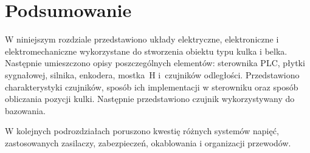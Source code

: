 \section{Podsumowanie}

W niniejszym rozdziale przedstawiono układy elektryczne, elektroniczne i elektromechaniczne wykorzystane do stworzenia obiektu typu kulka i belka. Następnie umieszczono opisy poszczególnych elementów: sterownika PLC, płytki sygnałowej, silnika, enkodera, mostka~H i~czujników odległości. Przedstawiono charakterystyki czujników, sposób ich implementacji w sterowniku oraz sposób obliczania pozycji kulki. Następnie przedstawiono czujnik wykorzystywany do bazowania.

W kolejnych podrozdziałach poruszono kwestię różnych systemów napięć, zastosowanych zasilaczy, zabezpieczeń, okablowania i organizacji przewodów.


